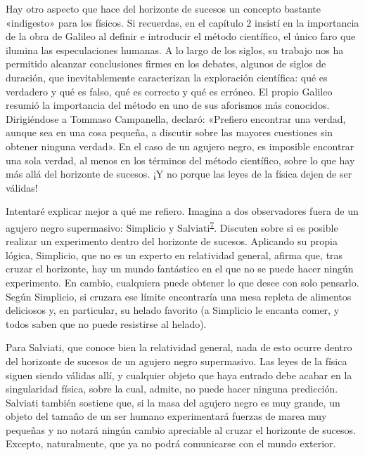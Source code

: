 Hay otro aspecto que hace del horizonte de sucesos un concepto bastante «indigesto» para los físicos. Si recuerdas, en el capítulo 2 insistí en la importancia de la obra de Galileo al definir e introducir el método científico, el único faro que ilumina las especulaciones humanas. A lo largo de los siglos, su trabajo nos ha permitido alcanzar conclusiones firmes en los debates, algunos de siglos de duración, que inevitablemente caracterizan la exploración científica: qué es verdadero y qué es falso, qué es correcto y qué es erróneo. El propio Galileo resumió la importancia del método en uno de sus aforismos más conocidos. Dirigiéndose a Tommaso Campanella, declaró: «Prefiero encontrar una verdad, aunque sea en una cosa pequeña, a discutir sobre las mayores cuestiones sin obtener ninguna verdad». En el caso de un agujero negro, es imposible encontrar una sola verdad, al menos en los términos del método científico, sobre lo que hay más allá del horizonte de sucesos. ¡Y no porque las leyes de la física dejen de ser válidas!

Intentaré explicar mejor a qué me refiero. Imagina a dos observadores fuera de un agujero negro supermasivo: Simplicio y Salviati\textsuperscript{\hyperlink{note:06-07}{7}}. Discuten sobre si es posible realizar un experimento dentro del horizonte de sucesos. Aplicando su propia lógica, Simplicio, que no es un experto en relatividad general, afirma que, tras cruzar el horizonte, hay un mundo fantástico en el que no se puede hacer ningún experimento. En cambio, cualquiera puede obtener lo que desee con solo pensarlo. Según Simplicio, si cruzara ese límite encontraría una mesa repleta de alimentos deliciosos y, en particular, su helado favorito (a Simplicio le encanta comer, y todos saben que no puede resistirse al helado).

Para Salviati, que conoce bien la relatividad general, nada de esto ocurre dentro del horizonte de sucesos de un agujero negro supermasivo. Las leyes de la física siguen siendo válidas allí, y cualquier objeto que haya entrado debe acabar en la singularidad física, sobre la cual, admite, no puede hacer ninguna predicción. Salviati también sostiene que, si la masa del agujero negro es muy grande, un objeto del tamaño de un ser humano experimentará fuerzas de marea muy pequeñas y no notará ningún cambio apreciable al cruzar el horizonte de sucesos. Excepto, naturalmente, que ya no podrá comunicarse con el mundo exterior.


